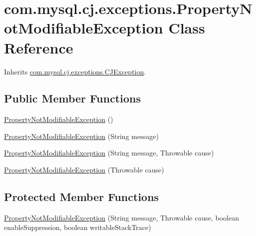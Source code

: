 \hypertarget{classcom_1_1mysql_1_1cj_1_1exceptions_1_1_property_not_modifiable_exception}{}\section{com.\+mysql.\+cj.\+exceptions.\+Property\+Not\+Modifiable\+Exception Class Reference}
\label{classcom_1_1mysql_1_1cj_1_1exceptions_1_1_property_not_modifiable_exception}


Inherits \mbox{\hyperlink{classcom_1_1mysql_1_1cj_1_1exceptions_1_1_c_j_exception}{com.\+mysql.\+cj.\+exceptions.\+C\+J\+Exception}}.

\subsection*{Public Member Functions}
\begin{DoxyCompactItemize}
\item 
\mbox{\hyperlink{classcom_1_1mysql_1_1cj_1_1exceptions_1_1_property_not_modifiable_exception_afc651c7d3397a56b19f05b8981e2a7f5}{Property\+Not\+Modifiable\+Exception}} ()
\item 
\mbox{\hyperlink{classcom_1_1mysql_1_1cj_1_1exceptions_1_1_property_not_modifiable_exception_a71d799504990514657df21aad0ebcc8d}{Property\+Not\+Modifiable\+Exception}} (String message)
\item 
\mbox{\hyperlink{classcom_1_1mysql_1_1cj_1_1exceptions_1_1_property_not_modifiable_exception_a453d39df061f60906350e1f68ec16acb}{Property\+Not\+Modifiable\+Exception}} (String message, Throwable cause)
\item 
\mbox{\hyperlink{classcom_1_1mysql_1_1cj_1_1exceptions_1_1_property_not_modifiable_exception_a0a3164177f3fd3a8e91bd1c30b8aec30}{Property\+Not\+Modifiable\+Exception}} (Throwable cause)
\end{DoxyCompactItemize}
\subsection*{Protected Member Functions}
\begin{DoxyCompactItemize}
\item 
\mbox{\hyperlink{classcom_1_1mysql_1_1cj_1_1exceptions_1_1_property_not_modifiable_exception_ae80af883e346fbe33c4eec879d50bf78}{Property\+Not\+Modifiable\+Exception}} (String message, Throwable cause, boolean enable\+Suppression, boolean writable\+Stack\+Trace)
\end{DoxyCompactItemize}
